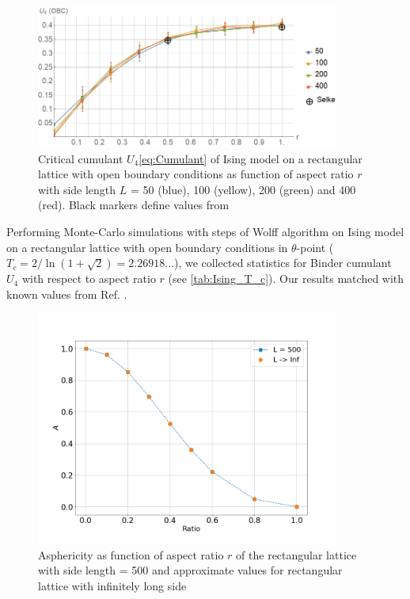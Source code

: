 \documentclass[a4paper]{jpconf}
\begin{document}
\begin{figure}[h]
    \centering
    \includegraphics[width=100mm]{Images/CumulantOBC.png}
    \caption{Critical cumulant $U_{4}$\eqref{eq:Cumulant} of Ising model on a rectangular lattice with open boundary conditions as function of aspect ratio $r$ with side length $L$ = 50 (blue), 100 (yellow), 200 (green) and 400 (red). Black markers define values from \cite{Selke2006}}
    \label{fig:A_r}
\end{figure}

Performing Monte-Carlo simulations with steps of Wolff algorithm \cite{Newmanb1999} on Ising model on a rectangular lattice with open boundary conditions in $\theta$-point ($T_{c} = 2/\ln{(1 + \sqrt{2})} =  2.26918... $), we collected statistics for Binder cumulant $U_{4}$ with respect to aspect ratio $r$ (see \cref{tab:Ising_T_c}). Our results matched with known values from Ref. \cite{Selke2006}.

\begin{figure}[h]
    \centering
    \includegraphics[width=100mm]{Images/A_r.png}
    \caption{Asphericity as function of aspect ratio $r$ of the rectangular lattice with side length = 500 and approximate values for rectangular lattice with infinitely long side}
    \label{fig:A_r}
\end{figure}
\end{document}
